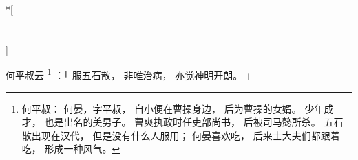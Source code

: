 
\switchcolumn[0]*[\section{}]

何平叔云%
\footnote{%
    何平叔：
        何晏，字平叔，
        自小便在曹操身边，
        后为曹操的女婿。
        少年成才，
        也是出名的美男子。
        曹爽执政时任吏部尚书，
        后被司马懿所杀。
        五石散出现在汉代，
        但是没有什么人服用；
        何晏喜欢吃，
        后来士大夫们都跟着吃，
        形成一种风气。
}%
：「
    服五石散，
    非唯治病，
    亦觉神明开朗。
」

\switchcolumn



